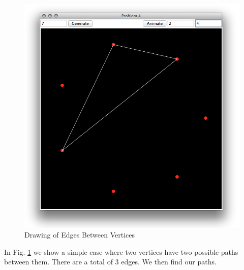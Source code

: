 \begin{figure}[H]
    \centering
        \includegraphics[width=4.75in,trim=1in .6in 1in 1in]{include/prob4before.png}
    \caption{Drawing of Edges Between Vertices}
    \label{fig:include_prob4before}
\end{figure}
In Fig. \ref{fig:include_prob4before} we show a simple case where two vertices have two possible paths between them. There are a total of 3 edges. We then find our paths.

